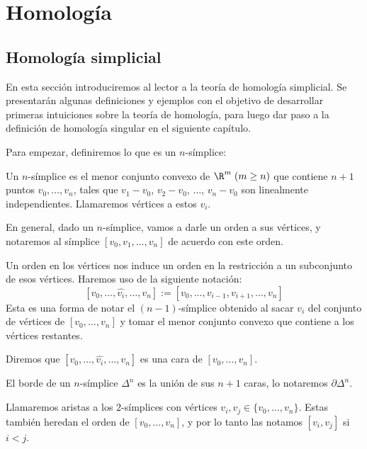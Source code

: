 \chapter{Homología}
\section{Homología simplicial}


En esta sección introduciremos al lector a la teoría de homología simplicial. Se presentarán algunas definiciones y ejemplos con el objetivo de desarrollar primeras intuiciones sobre la teoría de homología, para luego dar paso a la definición de homología singular en el siguiente capítulo. \br 


Para empezar, definiremos lo que es un $n$-símplice:\br

\begin{df} Un $n$-símplice es el menor conjunto convexo de $\R^{m}\; (m\geq n)$ que contiene $n+1$ puntos $v_0,\dots,v_n$, tales que $v_1-v_0$, $v_2-v_0$, $\dots$, $v_n-v_0$ son linealmente independientes. Llamaremos vértices a estos $v_i$.\end{df}\br

En general, dado un $n$-símplice, vamos a darle un orden a sus vértices, y notaremos al símplice $[v_0,v_1,\dots,v_n]$ de acuerdo con este orden. \br

\begin{df}
Un orden en los vértices nos induce un orden en la restricción a un subconjunto de esos vértices. Haremos uso de la siguiente notación:
$$[v_0,\dots,\hat{v_i},\dots,v_n]:=[v_0,\dots,v_{i-1},v_{i+1},\dots,v_n]$$ \br
Esta es una forma de notar el $(n-1)$-símplice obtenido al sacar $v_i$ del conjunto de vértices de $[v_0,\dots,v_n]$ y tomar el menor conjunto convexo que contiene a los vértices restantes. \br

Diremos que $[v_0,\dots,\hat{v_i},\dots,v_n]$ es una cara de $[v_0,\dots,v_n]$.\br

\begin{obs}
El borde de un $n$-símplice $\Delta^n$ es la unión de sus $n+1$ caras, lo notaremos $\partial\Delta^n$. \br
\end{obs}

Llamaremos aristas a los $2$-símplices con vértices $v_i, v_j\in\{v_0,\dots,v_n\}$. Estas también heredan el orden de $[v_0,\dots,v_n]$, y por lo tanto las notamos $[v_i,v_j]$ si $i<j$.\br
\end{df}

